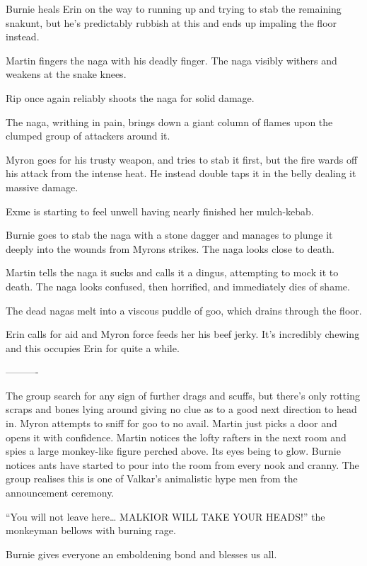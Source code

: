 Burnie heals Erin on the way to running up and trying to stab the remaining snakunt, but he’s predictably rubbish at this and ends up impaling the floor instead.\medskip

Martin fingers the naga with his deadly finger. The naga visibly withers and weakens at the snake knees.\medskip

Rip once again reliably shoots the naga for solid damage.\medskip

The naga, writhing in pain, brings down a giant column of flames upon the clumped group of attackers around it.\medskip

Myron goes for his trusty weapon, and tries to stab it first, but the fire wards off his attack from the intense heat. He instead double taps it in the belly dealing it massive damage.\medskip

Exme is starting to feel unwell having nearly finished her mulch-kebab.\medskip

Burnie goes to stab the naga with a stone dagger and manages to plunge it deeply into the wounds from Myrons strikes. The naga looks close to death.\medskip

Martin tells the naga it sucks and calls it a dingus, attempting to mock it to death. The naga looks confused, then horrified, and immediately dies of shame.\medskip

The dead nagas melt into a viscous puddle of goo, which drains through the floor.\medskip

Erin calls for aid and Myron force feeds her his beef jerky. It’s incredibly chewing and this occupies Erin for quite a while.\medskip

—-------\medskip

The group search for any sign of further drags and scuffs, but there’s only rotting scraps and bones lying around giving no clue as to a good next direction to head in. Myron attempts to sniff for goo to no avail. Martin just picks a door and opens it with confidence. Martin notices the lofty rafters in the next room and spies a large monkey-like figure perched above. Its eyes being to glow. Burnie notices ants have started to pour into the room from every nook and cranny. The group realises this is one of Valkar’s animalistic hype men from the announcement ceremony.\medskip

“You will not leave here… MALKIOR WILL TAKE YOUR HEADS!” the monkeyman bellows with burning rage.\medskip

Burnie gives everyone an emboldening bond and blesses us all.\medskip


